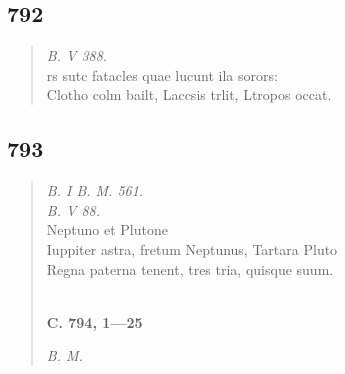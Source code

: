 \documentclass[11pt, a4paper]{report}
\begin{document}
\begin{verse}
      \end{verse}
  
            \subsection*{792}
      \begin{verse}
      \textit{B. V 388.} \\ rs sutc fatacles quae lucunt ila sorors: \\ Clotho colm bailt, Laccsis trlit, Ltropos occat. \\ 
      \end{verse}
  
            \subsection*{793}
      \begin{verse}
      \textit{B. I B. M. 561.} \\ \textit{B. V 88.} \\ Neptuno et Plutone \\ Iuppiter astra, fretum Neptunus, Tartara Pluto \\ Regna paterna tenent, tres tria, quisque suum. \\ 
        ﻿\pagebreak 
    \begin{center} \textbf{C. 794, 1—25} \end{center} \marginpar{[07]} \textit{B. M.} \\ 
      \end{verse}
  
\end{document}
